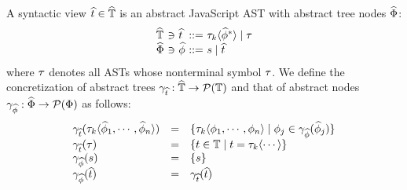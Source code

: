 A syntactic view $\widehat{t} \in \widehat{\mathbb{T}}$ is an abstract JavaScript AST with
abstract tree nodes $\widehat{\Phi}$:
\[
  \begin{array}{l@{~}c@{~}l@{~}c@{~}l}
    \atreeset &\ni& \atree &::=& \ty_k \langle \anode^* \rangle \mid \ty\\
    \anodeset &\ni& \anode &::=& \str \mid \atree\\
  \end{array}
\]
where $\tau$ denotes all ASTs whose nonterminal symbol $\tau$. We define the
concretization of abstract trees $\gamma_{\widehat{t}}: \widehat{\mathbb{T}} \rightarrow
\mathcal{P}(\mathbb{T})$ and that of abstract nodes $\gamma_{\widehat{\phi}}: \widehat{\Phi}
\rightarrow \mathcal{P}(\Phi)$ as follows:
\[
  \begin{array}{lcl}
    \gamma_{\widehat{t}}(\tau_k \langle \widehat{\phi}_1, \cdots, \widehat{\phi}_n \rangle) &=&
    \{ \tau_k \langle \phi_1, \cdots, \phi_n \rangle \mid \phi_j \in
    \gamma_{\widehat{\phi}}(\widehat{\phi}_j) \}\\

    \gamma_{\widehat{t}}(\tau) &=&
    \{ t \in \mathbb{T} \mid t = \tau_k \langle \cdots \rangle \}\\

    \gamma_{\widehat{\phi}}(s) &=& \{ s \}\\

    \gamma_{\widehat{\phi}}(\widehat{t}) &=& \gamma_{\widehat{t}}(\widehat{t})\\
  \end{array}
\]
% 
% 
% 
% 
% 
